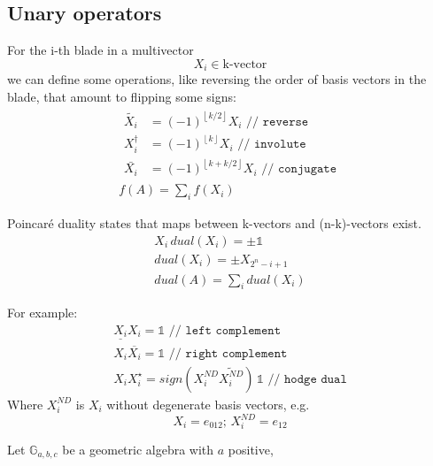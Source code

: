 \documentclass[twoside]{article}
\newcommand{\T}[1]{\textrm{#1}} %
\newcommand{\plusminus}{\pm}
\newcommand{\floor}[1]{{\left\lfloor{#1}\right\rfloor}}
\begin{document}
\begin{multicols*}{2}
        \section{Unary operators}
            \par
                For the i-th blade in a multivector
                $$ X_i \in \T{k-vector} $$
                we can define some operations, like reversing the order of
                basis vectors in the blade, that amount to flipping some signs:
                \begin{gather*}
                    \begin{aligned}
                        \tilde{X_i} &= (-1)^\floor{k/2} X_i \texttt{ // reverse} \\
                        X_i^\dagger &= (-1)^\floor{k} X_i \texttt{ // involute} \\
                        \bar{X_i} &= (-1)^\floor{k+k/2} X_i \texttt{ // conjugate}
                    \end{aligned} \\
                    f(A) = \sum_i f(X_i)
                \end{gather*}
            \par
                Poincaré duality states that maps between k-vectors and (n-k)-vectors exist.
                \begin{gather*}
                    X_i \, dual(X_i) = \plusminus \mathbb{1} \\
                    dual(X_i) = \plusminus X_{2^n-i+1} \\
                    dual(A) = \sum_i dual(X_i)
                \end{gather*}
            \par
                For example:
                \begin{gather*}
                    \underline{X_i} X_i = \mathbb{1} \texttt{ // left complement} \\ %
                    X_i \overline{X_i} = \mathbb{1} \texttt{ // right complement} \\
                    X_i X_i^\star = sign(X^{ND}_i \widetilde{X^{ND}_i}) \, \mathbb{1} \texttt{ // hodge dual}
                \end{gather*}
                Where $ X^{ND}_i $ is $ X_i $ without degenerate basis vectors, e.g.
                $$ X_i = e_{012}; \, X^{ND}_i = e_{12} $$
            \par
                Let $ \mathbb{G}_{a,b,c} $ be a geometric algebra with $ a $ positive,

\end{multicols*}
\end{document}

